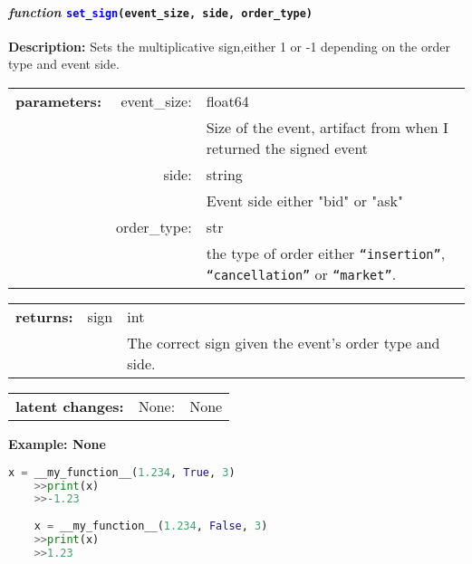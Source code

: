 \paragraph{\textit{function} \textcolor{blue}{\texttt{set\_sign}}\texttt{(event\_size, side, order\_type)}}\hfill\break
\noindent \textbf{Description:} Sets the multiplicative sign,either 1 or -1 depending on the order type and event side. 

\begin{tabular}{r r l }
	\textbf{parameters:}	& event\_size: & float64\\
	&  & Size of  the event, artifact from when I returned the signed event\\
	& side:& string\\
	&& Event side either "bid" or "ask"\\
	& order\_type:& str\\
	&& the type of order either \texttt{``insertion''}, \texttt{``cancellation''} or \texttt{``market''}.
\end{tabular}

\begin{tabular}{l c l}
	\textbf{returns:} & sign & int\\
	& & The correct sign given the event's order type and side.
\end{tabular}

\begin{tabular}{l c l}
	\textbf{latent changes:} & None: & None\\
\end{tabular}

\textbf{Example: None}
\begin{lstlisting}[language=Python]
	x = __my_function__(1.234, True, 3)
	>>print(x)
	>>-1.23
	
	x = __my_function__(1.234, False, 3)
	>>print(x)
	>>1.23
\end{lstlisting}